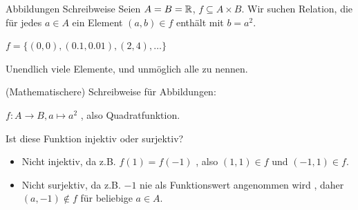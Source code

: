 \documentclass{beamer}
\begin{document}
\begin{frame}{Abbildungen Schreibweise}
	Seien $A = B = \mathbb{R}$, $f \subseteq A \times B$.   Wir suchen Relation, die für jedes $a \in A$ ein Element $(a, b) \in f$ enthält mit $b = a^2$. 
	
	$f = \{(0, 0), (0.1, 0.01), (2, 4), \dots\}$ 
	
	  Unendlich viele Elemente, und unmöglich alle zu nennen.
	
	 (Mathematischere) Schreibweise für Abbildungen: 
	
	$f : A \rightarrow B, a \mapsto a^2$  , also Quadratfunktion.
	
	  Ist diese Funktion injektiv oder surjektiv?   
	
	\begin{itemize}
		\item Nicht injektiv, da z.B. $f(1) = f(-1)$  , also $(1, 1) \in f$ und $(-1, 1) \in f$. 
		\item Nicht surjektiv, da z.B. $-1$ nie als Funktionswert angenommen wird  , daher $(a, -1) \not\in f$ für beliebige $a \in A$.
	
	\end{itemize}
	
\end{frame}


\end{document}
